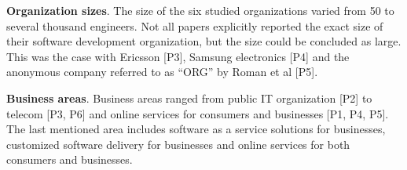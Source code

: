{\bfseries Organization sizes}. The size of the six studied
organizations varied from 50 to several thousand engineers. Not all
papers explicitly reported the exact size of their software development
organization, but the size could be concluded as large. This was the
case with Ericsson [P3], Samsung electronics [P4] and the anonymous
company referred to as ``ORG'' by Roman et al [P5].

{\bfseries Business areas}. Business areas ranged from public IT
organization [P2] to telecom [P3, P6] and online services for consumers
and businesses [P1, P4, P5]. The last mentioned area includes software
as a service solutions for businesses, customized software delivery for
businesses and online services for both consumers and businesses.
